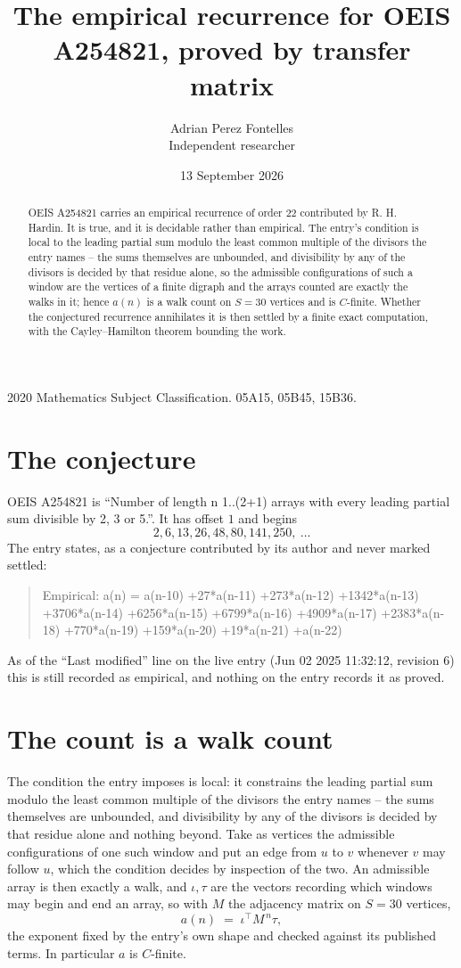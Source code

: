\documentclass[11pt,a4paper]{article}
\title{The empirical recurrence for OEIS A254821, proved by transfer matrix}
\author{Adrian Perez Fontelles\\ \small Independent researcher}
\date{13 September 2026}
\theoremstyle{plain}
\theoremstyle{definition}
\begin{document}
\maketitle

\begin{abstract}
OEIS A254821 carries an empirical recurrence of order $22$ contributed by R. H. Hardin. It is
true, and it is decidable rather than empirical. The entry's condition is local to the leading partial sum modulo the least common multiple of the divisors the entry names -- the sums themselves are unbounded, and divisibility by any of the divisors is decided by that residue alone, so
the admissible configurations of such a window are the vertices of a finite digraph and the
arrays counted are exactly the walks in it; hence $a(n)$ is a walk count on $S=30$ vertices
and is $C$-finite. Whether the conjectured recurrence annihilates it is then settled by a
finite exact computation, with the Cayley--Hamilton theorem bounding the work.
\end{abstract}

\noindent\small 2020 Mathematics Subject Classification. 05A15, 05B45, 15B36.\normalsize

\section{The conjecture}

OEIS A254821 is ``Number of length n 1..(2+1) arrays with every leading partial sum divisible by 2, 3 or 5.''. It has offset $1$ and begins
\[
2, 6, 13, 26, 48, 80, 141, 250,\ \dots
\]
The entry states, as a conjecture contributed by its author and never marked settled:
\begin{quote}
Empirical: a(n) = a(n-10) +27*a(n-11) +273*a(n-12) +1342*a(n-13) +3706*a(n-14) +6256*a(n-15) +6799*a(n-16) +4909*a(n-17) +2383*a(n-18) +770*a(n-19) +159*a(n-20) +19*a(n-21) +a(n-22)
\end{quote}
As of the ``Last modified'' line on the live entry (Jun 02 2025 11:32:12, revision 6) this is still
recorded as empirical, and nothing on the entry records it as proved.

\section{The count is a walk count}

The condition the entry imposes is local: it constrains the leading partial sum modulo the least common multiple of the divisors the entry names -- the sums themselves are unbounded, and divisibility by any of the divisors is decided by that residue alone and nothing beyond. Take as vertices the admissible configurations of one such window and put an edge from $u$ to $v$ whenever $v$ may follow $u$, which the condition decides by inspection of the two.
An admissible array is then exactly a walk, and $\iota,\tau$ are the vectors recording which windows may begin and end an array, so with $M$ the adjacency matrix on $S=30$ vertices,
\[
a(n)\;=\;\iota^{\!\top}M^{\,n}\tau ,
\]
the exponent fixed by the entry's own shape and checked against its published terms. In
particular $a$ is $C$-finite.
\end{document}
